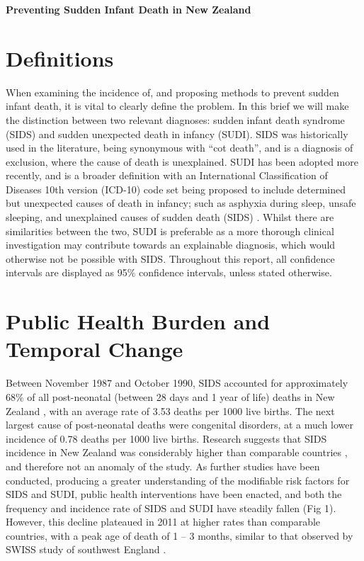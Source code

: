 \documentclass[11pt]{article}
\begin{document}
\begin{center}
    \LARGE\textbf{Preventing Sudden Infant Death in New Zealand}
\end{center}

\section{Definitions}

When examining the incidence of, and proposing methods to prevent sudden infant death, it is vital to clearly define the problem. 
In this brief we will make the distinction between two relevant diagnoses: sudden infant death syndrome (SIDS) and sudden unexpected death in infancy (SUDI). 
SIDS was historically used in the literature, being synonymous with “cot death”, and is a diagnosis of exclusion, where the cause of death is unexplained.
SUDI has been adopted more recently, and is a broader definition with an International Classification of Diseases 10th version (ICD-10) code set being proposed to include determined but unexpected causes of death in infancy; such as asphyxia during sleep, unsafe sleeping, and unexplained causes of sudden death (SIDS) \autocite{Mitchellcombinationbedsharing2017}.
Whilst there are similarities between the two, SUDI is preferable as a more thorough clinical investigation may contribute towards an explainable diagnosis, which would otherwise not be possible with SIDS.
Throughout this report, all confidence intervals are displayed as 95\% confidence intervals, unless stated otherwise.

\section{Public Health Burden and Temporal Change}

Between November 1987 and October 1990, SIDS accounted for approximately 68\% of all post-neonatal (between 28 days and 1 year of life) deaths in New Zealand \autocite{MitchellFourmodifiableother1992}, with an average rate of 3.53 deaths per 1000 live births. 
The next largest cause of post-neonatal deaths were congenital disorders, at a much lower incidence of 0.78 deaths per 1000 live births. 
Research suggests that SIDS incidence in New Zealand was considerably higher than comparable countries \autocite{MitchellFourmodifiableother1992}, and therefore not an anomaly of the study. 
As further studies have been conducted, producing a greater understanding of the modifiable risk factors for SIDS and SUDI, public health interventions have been enacted, and both the frequency and incidence rate of SIDS and SUDI have steadily fallen (Fig 1). 
However, this decline plateaued in 2011 at higher rates than comparable countries, with a peak age of death of 1 – 3 months, similar to that observed by SWISS study of southwest England \autocite{Mitchellcombinationbedsharing2017}.
\end{document}
